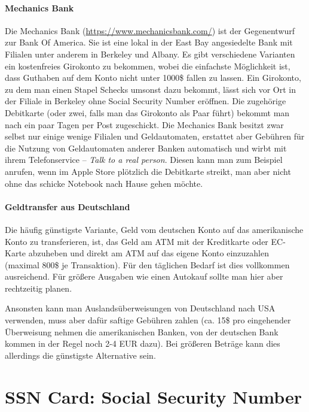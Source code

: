 \documentclass[a4paper]{scrreprt}
\begin{document}

\paragraph{Mechanics Bank}
Die Mechanics Bank (\url{https://www.mechanicsbank.com/}) ist der
Gegenentwurf zur Bank Of America. Sie ist eine lokal in der East Bay
angesiedelte Bank mit Filialen unter anderem in Berkeley und
Albany. Es gibt verschiedene Varianten ein kostenfreies Girokonto zu
bekommen, wobei die einfachste Möglichkeit ist, dass Guthaben auf dem
Konto nicht unter 1000\$ fallen zu lassen. Ein Girokonto, zu dem man
einen Stapel Schecks umsonst dazu bekommt, lässt sich vor Ort in der
Filiale in Berkeley ohne Social Security Number eröffnen. Die
zugehörige Debitkarte (oder zwei, falls man das Girokonto als Paar
führt) bekommt man nach ein paar Tagen per Post zugeschickt. Die
Mechanics Bank besitzt zwar selbst nur einige wenige Filialen und
Geldautomaten, erstattet aber Gebühren für die Nutzung von
Geldautomaten anderer Banken automatisch und wirbt mit ihrem
Telefonservice -- \emph{Talk to a real person}. Diesen kann man zum
Beispiel anrufen, wenn im Apple Store plötzlich die Debitkarte
streikt, man aber nicht ohne das schicke Notebook nach Hause gehen
möchte.

\paragraph{Geldtransfer aus Deutschland}

Die häufig günstigste Variante, Geld vom deutschen Konto auf das amerikanische Konto zu transferieren, ist, das Geld am ATM mit der Kreditkarte oder EC-Karte abzuheben und direkt am ATM auf das eigene Konto einzuzahlen (maximal 800\$ je Transaktion). Für den täglichen Bedarf ist dies vollkommen ausreichend. Für größere Ausgaben wie einen Autokauf sollte man hier aber rechtzeitig planen.

Ansonsten kann man Auslandsüberweisungen von Deutschland nach USA verwenden, muss aber dafür saftige Gebühren zahlen (ca. 15\$ pro eingehender Überweisung nehmen die amerikanischen Banken, von der deutschen Bank kommen in der Regel noch 2-4 EUR dazu). Bei größeren Beträge kann dies allerdings die günstigste Alternative sein.

\section{SSN Card: Social Security Number}
\end{document}
